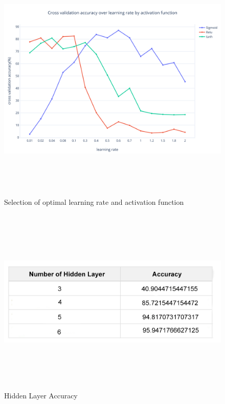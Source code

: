 \begin{figure}[H]
\begin{center}
    
\includegraphics[width=150mm,height=120mm]{dataset_summary/selectionHyperparameter.png}
 \caption{Selection of optimal learning rate and activation function}
 \end{center}                
\end{figure}

\begin{figure}[H]
\begin{center}
    
\includegraphics[width=120mm,height=90mm]{comparison/hiddenlayer.jpg}
 \caption{Hidden Layer Accuracy}
 \end{center}                
\end{figure}




